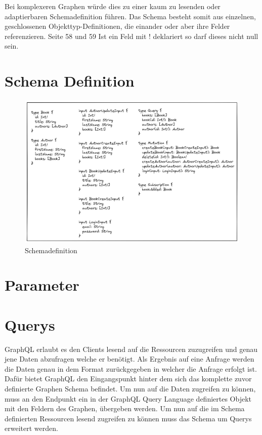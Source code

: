 Bei komplexeren Graphen würde dies zu einer kaum zu lesenden oder adaptierbaren Schemadefinition führen.
Das Schema besteht somit aus einzelnen, geschlossenen Objekttyp-Definitionen, die einander oder aber ihre Felder referenzieren. Seite 58 und 59
Ist ein Feld mit ! deklariert so darf dieses nicht null sein.

\section{Schema Definition}


\begin{figure}[H]
    \includegraphics[width=\textwidth]{pics/schema.png}
    \caption{Schemadefinition}
\end{figure}


\section{Parameter}

\section{Querys}

GraphQL erlaubt es den Clients lesend auf die Ressourcen zuzugreifen und genau jene Daten abzufragen welche er benötigt.
Als Ergebnis auf eine Anfrage werden die Daten genau in dem Format zurückgegeben in welcher die Anfrage erfolgt ist.
Dafür bietet GraphQL den Eingangspunkt hinter dem sich das komplette zuvor definierte Graphen Schema befindet.
Um nun auf die Daten zugreifen zu können, muss an den Endpunkt ein in der GraphQL Query Language definiertes Objekt mit den Feldern des Graphen, übergeben werden.
Um nun auf die im Schema definierten Ressourcen lesend zugreifen zu können muss das Schema um Querys erweitert werden. 

